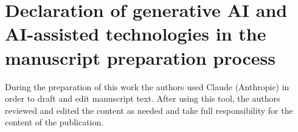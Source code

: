 \documentclass[preprint,12pt,authoryear]{elsarticle}
\begin{document}
\section*{Declaration of generative AI and AI-assisted technologies in the manuscript preparation process}
During the preparation of this work the authors used Claude (Anthropic) in order to draft and edit manuscript text. After using this tool, the authors reviewed and edited the content as needed and take full responsibility for the content of the publication.




\nolinenumbers
\end{document}
